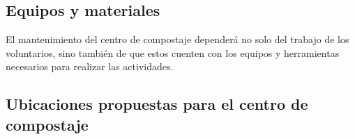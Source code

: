 \subsection{Equipos y materiales}

El mantenimiento del centro de compostaje dependerá no solo del trabajo de los voluntarios, sino también de que estos cuenten con los equipos  y herramientas necesarios para realizar las actividades.

    
\subsection{Ubicaciones propuestas para el centro de compostaje}

    
